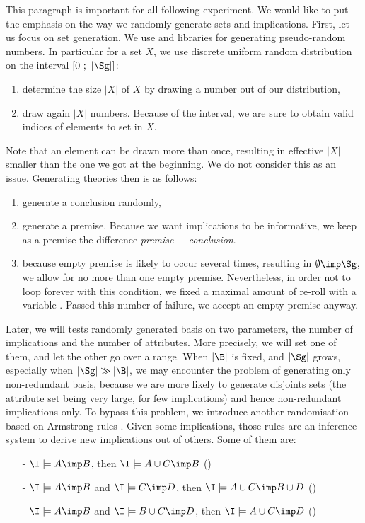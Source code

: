 This paragraph is important for all following experiment.
We would like to put the emphasis on the way we randomly generate sets and 
implications. First, let us focus on set generation. We use  
and  libraries for generating pseudo-random numbers. In particular 
for a set $X$, we use discrete uniform random distribution on the interval 
$\lbrack 0 \ ; \ |\Sg| \rbrack$:
\begin{enumerate}
	\item determine the size $|X|$ of $X$ by drawing a number out of our 
	distribution,
	\item draw again $|X|$ numbers. Because of the interval, we are sure to
	obtain valid indices of elements to set in $X$.
\end{enumerate}
\noindent Note that an element can be drawn more than once, resulting in 
effective $|X|$ smaller than the one we got at the beginning. We do not consider
this as an issue. Generating theories then is as follows:
\begin{enumerate}
	\item generate a conclusion randomly,
	\item generate a premise. Because we want implications to be informative,
	we keep as a premise the difference \textit{premise $-$ conclusion}.
	\item because empty premise is likely to occur several times, resulting in
	$\emptyset \imp \Sg$, we allow for no more than one empty premise. 
	Nevertheless, in order not to loop forever with this condition, we fixed
	a maximal amount of re-roll with a variable . Passed this 
	number of failure, we accept an empty premise anyway.
\end{enumerate}
\noindent Later, we will tests randomly generated basis on two parameters, the number of implications and the number of attributes. More precisely, we will set one of them, and let the other go over a range. When $|\B|$ is fixed, and $|\Sg|$ grows, especially when $|\Sg| \gg |\B|$, we may encounter the problem of generating only non-redundant basis, because we are more likely to generate
disjoints sets (the attribute set being very large, for few implications) and hence non-redundant implications only. To bypass this problem, we introduce
another randomisation based on Armstrong rules \cite{armstrong_dependency_1974, ganter_conceptual_2016}. Given some implications, those rules are an inference system to derive new implications out of others. Some of them are:
\begin{itemize}
	\item[-] $\I \models A \imp B$, then $\I \models A \cup C \imp B$ ()
	\item[-] $\I \models A \imp B$ and $ \I \models C \imp D$, then $\I \models A \cup C \imp B \cup D$ ()
	\item[-] $\I \models A \imp B$ and $ \I \models B \cup C \imp D$, then 
	$\I \models A \cup C \imp D$ ()
\end{itemize}
